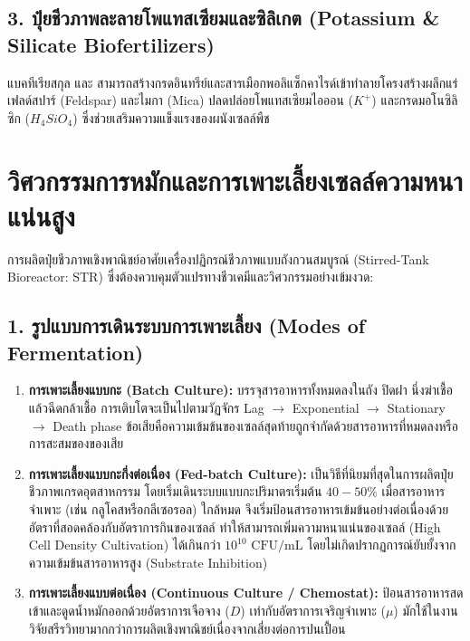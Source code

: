 \subsection{3. ปุ๋ยชีวภาพละลายโพแทสเซียมและซิลิเกต (Potassium \& Silicate Biofertilizers)}
แบคทีเรียสกุล  และ  สามารถสร้างกรดอินทรีย์และสารเมือกพอลิแซ็กคาไรด์เข้าทำลายโครงสร้างผลึกแร่เฟลด์สปาร์ (Feldspar) และไมกา (Mica) ปลดปล่อยโพแทสเซียมไอออน ($K^+$) และกรดมอโนซิลิซิก ($H_4SiO_4$) ซึ่งช่วยเสริมความแข็งแรงของผนังเซลล์พืช

\section{วิศวกรรมการหมักและการเพาะเลี้ยงเซลล์ความหนาแน่นสูง}

การผลิตปุ๋ยชีวภาพเชิงพาณิชย์อาศัยเครื่องปฏิกรณ์ชีวภาพแบบถังกวนสมบูรณ์ (Stirred-Tank Bioreactor: STR) ซึ่งต้องควบคุมตัวแปรทางชีวเคมีและวิศวกรรมอย่างเข้มงวด:

\subsection{1. รูปแบบการเดินระบบการเพาะเลี้ยง (Modes of Fermentation)}
\begin{enumerate}
    \item \textbf{การเพาะเลี้ยงแบบกะ (Batch Culture):} บรรจุสารอาหารทั้งหมดลงในถัง ปิดฝา นึ่งฆ่าเชื้อ แล้วฉีดกล้าเชื้อ การเติบโตจะเป็นไปตามวัฏจักร Lag $\rightarrow$ Exponential $\rightarrow$ Stationary $\rightarrow$ Death phase ข้อเสียคือความเข้มข้นของเซลล์สุดท้ายถูกจำกัดด้วยสารอาหารที่หมดลงหรือการสะสมของของเสีย
    \item \textbf{การเพาะเลี้ยงแบบกะกึ่งต่อเนื่อง (Fed-batch Culture):} เป็นวิธีที่นิยมที่สุดในการผลิตปุ๋ยชีวภาพเกรดอุตสาหกรรม โดยเริ่มเดินระบบแบบกะปริมาตรเริ่มต้น $40 - 50\%$ เมื่อสารอาหารจำเพาะ (เช่น กลูโคสหรือกลีเซอรอล) ใกล้หมด จึงเริ่มป้อนสารอาหารเข้มข้นอย่างต่อเนื่องด้วยอัตราที่สอดคล้องกับอัตราการกินของเซลล์ ทำให้สามารถเพิ่มความหนาแน่นของเซลล์ (High Cell Density Cultivation) ได้เกินกว่า $10^{10}\text{ CFU/mL}$ โดยไม่เกิดปรากฏการณ์ยับยั้งจากความเข้มข้นสารอาหารสูง (Substrate Inhibition)
    \item \textbf{การเพาะเลี้ยงแบบต่อเนื่อง (Continuous Culture / Chemostat):} ป้อนสารอาหารสดเข้าและดูดน้ำหมักออกด้วยอัตราการเจือจาง ($D$) เท่ากับอัตราการเจริญจำเพาะ ($\mu$) มักใช้ในงานวิจัยสรีรวิทยามากกว่าการผลิตเชิงพาณิชย์เนื่องจากเสี่ยงต่อการปนเปื้อน
\end{enumerate}

